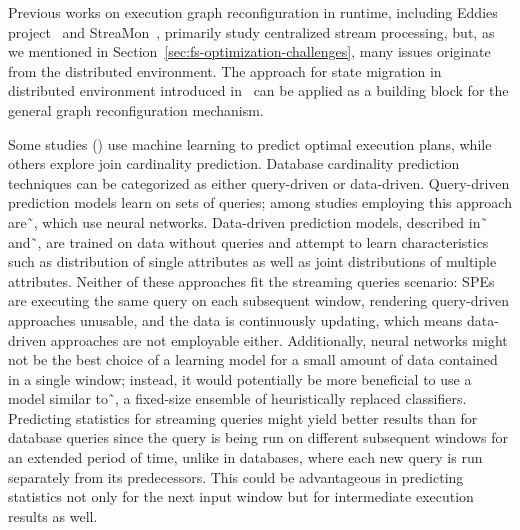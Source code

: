 Previous works on execution graph reconfiguration in runtime, including Eddies project~\cite{10.1145/335191.335420} and StreaMon~\cite{10.1145/1007568.1007702}, primarily study centralized stream processing, but, as we mentioned in Section~\ref{sec:fs-optimization-challenges}, many issues originate from the distributed environment. The approach for state migration in distributed environment introduced in~\cite{10.14778/3329772.3329777} can be applied as a building block for the general graph reconfiguration mechanism.

Some studies (\cite{krishnan2018learning, marcus2019neo}) use machine learning to predict optimal execution plans, while others explore join cardinality prediction. Database cardinality prediction techniques can be categorized as either query-driven or data-driven. Query-driven prediction models learn on sets of queries; among studies employing this approach are˜\cite{liu2015cardinality, CHEN20211047, kipf2018learned, ortiz2019empirical}, which use neural networks. Data-driven prediction models, described in˜\cite{hilprecht2020deepdb} and˜\cite{yang2020neurocard}, are trained on data without queries and attempt to learn characteristics such as distribution of single attributes as well as joint distributions of multiple attributes. Neither of these approaches fit the streaming queries scenario: SPEs are executing the same query on each subsequent window, rendering query-driven approaches unusable, and the data is continuously updating, which means data-driven approaches are not employable either. Additionally, neural networks might not be the best choice of a learning model for a small amount of data contained in a single window; instead, it would potentially be more beneficial to use a model similar to˜\cite{street2001ensemble}, a fixed-size ensemble of heuristically replaced classifiers. Predicting statistics for streaming queries might yield better results than for database queries since the query is being run on different subsequent windows for an extended period of time, unlike in databases, where each new query is run separately from its predecessors. This could be advantageous in predicting statistics not only for the next input window but for intermediate execution results as well.




